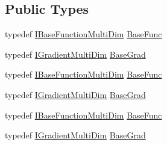 \subsection*{Public Types}
\begin{DoxyCompactItemize}
\item 
typedef \mbox{\hyperlink{classROOT_1_1Math_1_1IBaseFunctionMultiDim}{I\+Base\+Function\+Multi\+Dim}} \mbox{\hyperlink{classROOT_1_1Math_1_1IGradientFunctionMultiDim_a803074495bafb5acf9f130b648001609}{Base\+Func}}
\item 
typedef \mbox{\hyperlink{classROOT_1_1Math_1_1IGradientMultiDim}{I\+Gradient\+Multi\+Dim}} \mbox{\hyperlink{classROOT_1_1Math_1_1IGradientFunctionMultiDim_a743fb0cecf99775cca175ca1edd603af}{Base\+Grad}}
\item 
typedef \mbox{\hyperlink{classROOT_1_1Math_1_1IBaseFunctionMultiDim}{I\+Base\+Function\+Multi\+Dim}} \mbox{\hyperlink{classROOT_1_1Math_1_1IGradientFunctionMultiDim_a803074495bafb5acf9f130b648001609}{Base\+Func}}
\item 
typedef \mbox{\hyperlink{classROOT_1_1Math_1_1IGradientMultiDim}{I\+Gradient\+Multi\+Dim}} \mbox{\hyperlink{classROOT_1_1Math_1_1IGradientFunctionMultiDim_a743fb0cecf99775cca175ca1edd603af}{Base\+Grad}}
\item 
typedef \mbox{\hyperlink{classROOT_1_1Math_1_1IBaseFunctionMultiDim}{I\+Base\+Function\+Multi\+Dim}} \mbox{\hyperlink{classROOT_1_1Math_1_1IGradientFunctionMultiDim_a803074495bafb5acf9f130b648001609}{Base\+Func}}
\item 
typedef \mbox{\hyperlink{classROOT_1_1Math_1_1IGradientMultiDim}{I\+Gradient\+Multi\+Dim}} \mbox{\hyperlink{classROOT_1_1Math_1_1IGradientFunctionMultiDim_a743fb0cecf99775cca175ca1edd603af}{Base\+Grad}}
\end{DoxyCompactItemize}
